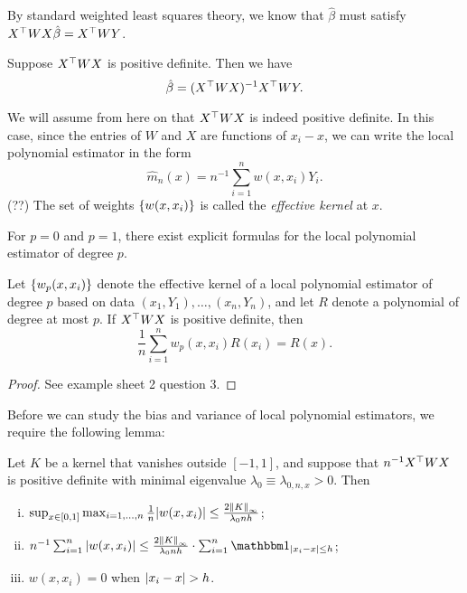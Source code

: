 By standard weighted least squares theory, we know that $\hat\beta$ must satisfy $X^\top W X\hat\beta = X^\top W Y$. 
\begin{proposition}
	Suppose $X^\top W X$ is positive definite. Then we have
	\[
	\hat\beta = (X^\top W X)^{-1} X^\top W Y. 
	\]

\end{proposition}

We will assume from here on that $X^\top W X$ is indeed positive definite. 
In this case, since the entries of $W$ and $X$ are functions of $x_i - x$, we can write the local polynomial estimator in the form
\[
\hat m_n(x) = n^{-1} \sum_{i=1}^n w(x, x_i) Y_i.
\]
(??)
The set of weights $\qty{w(x, x_i)}$ is called the \emph{effective kernel} at $x$. 

For $p = 0$ and $p = 1$, there exist explicit formulas for the local polynomial estimator of degree $p$. 

\begin{proposition} \label{prop_reproducing}
	Let $\qty{w_p(x, x_i)}$ denote the effective kernel of a local polynomial estimator of degree $p$ based on data $(x_1, Y_1), \dotsc, (x_n, Y_n)$, and let $R$ denote a polynomial of degree at most $p$. If $X^\top W X$ is positive definite, then 
	\[
	\frac1n \sum_{i=1}^n w_p(x, x_i) R(x_i) = R(x). 
	\]
\end{proposition}

\begin{proof}
See example sheet 2 question 3.
\end{proof}

Before we can study the bias and variance of local polynomial estimators, we require the following lemma:
\begin{lemma}
	Let $K$ be a kernel that vanishes outside $[-1, 1]$, and suppose that $n^{-1} X^\top W X$ is positive definite with minimal eigenvalue $\lambda_0 \equiv \lambda_{0, n, x} > 0$. Then 
	\begin{enumerate}[(i)]
		\item $\sup_{x\in[0, 1]} \max_{i = 1, \dotsc, n} \frac1n \abs{w(x, x_i)} \leq \frac{2\norm{K}_\infty}{\lambda_0 n h}$;
		\item $n^{-1} \sum_{i=1}^n \abs{w(x, x_i)} \leq \frac{2\norm{K}_\infty}{\lambda_0 n h}\cdot  \sum_{i=1}^n \ind_{\abs{x_i - x} \leq h}$;
		\item $w(x, x_i) = 0$ when $\abs{x_i - x} > h$. 
	\end{enumerate}
\end{lemma}

